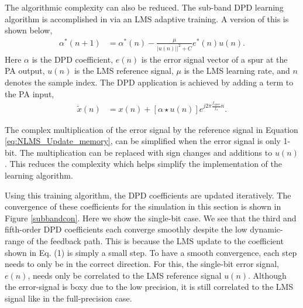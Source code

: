 \documentclass[conference]{IEEEtran}
\begin{document}
 The algorithmic complexity can also be reduced. The sub-band DPD learning algorithm is accomplished in \cite{TMTT_SubbandDPD} via an LMS adaptive training. A version of this is shown below,
 \begin{align}
 \alpha^*(n+1) &= \alpha^*(n) - \frac{\mu}{|u(n)||^2 + C} e^*(n) u(n).
 \label{eq:NLMS_Update_memory}
 \end{align}
Here $\alpha$ is the DPD coefficient,
$e(n)$ is the error signal vector of a spur at the PA output, $u(n)$ is the LMS reference signal, $\mu$ is the LMS learning rate, and $n$ denotes the sample index. 
The DPD application is achieved by adding a term to the PA input,
\begin{align}
\tilde{x}(n) &=  x(n) + \left[\alpha \star u(n) \right] e^{j 2\pi \frac{f_{spur}}{f_s} n}.
\end{align}

The complex multiplication of the error signal by the reference signal in Equation \ref{eq:NLMS_Update_memory}, can be simplified when the error signal is only 1-bit. The multiplication can be replaced with sign changes and additions to $u(n)$. This reduces the complexity which helps simplify the implementation of the learning algorithm. 

Using this training algorithm, the DPD coefficients are updated iteratively. The convergence of these coefficients for the simulation in this section is shown in Figure \ref{subbandcon}. Here we show the single-bit case. We see that the third and fifth-order DPD coefficients each converge smoothly despite the low dynamic-range of the feedback path. This is because the LMS update to the coefficient shown in Eq. (1) is simply a small step. To have a smooth convergence, each step needs to only be in the correct direction. For this, the single-bit error signal, $e(n)$, needs only be correlated to the LMS reference signal $u(n).$ Although the error-signal is boxy due to the low precision, it is still correlated to the LMS signal like in the full-precision case. 
\end{document}
